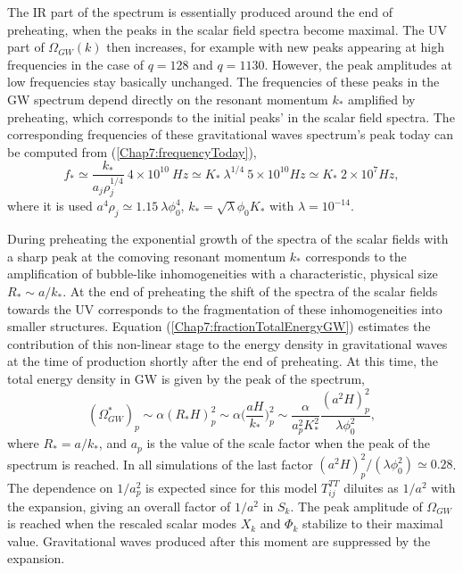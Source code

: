 \documentclass[11pt,a4paper,twoside]{book}
\begin{document}
The IR part of the spectrum is essentially produced around the end of preheating, when the peaks in the scalar field spectra  become maximal. The UV part of $\Omega_{GW}(k)$ then increases, for example with new peaks appearing at high frequencies in the case of $ q=128 $ and $ q=1130 $. However, the peak amplitudes at low frequencies stay basically unchanged. The frequencies of these peaks in the GW spectrum depend directly on the resonant momentum $ k_{*} $ amplified by preheating, which corresponds to the initial peaks' in the scalar field spectra. The corresponding frequencies of these gravitational waves spectrum's peak today can be computed from (\ref{Chap7:frequencyToday}),
\begin{equation}
	\label{Chap7:frequencyTodayResonance}
	f_{*}\simeq \frac{k_{*}}{a_{j}\rho_{j}^{1/4}}\ 4 \times 10^{10}\ Hz \simeq K_{*}\ \lambda^{1/4}\ 5 \times 10^{10} Hz \simeq K_{*}\ 2 \times 10^{7} Hz, 
\end{equation}
where it is used $ a^{4}\rho_{j} \simeq 1.15\ \lambda \phi_{0}^{4} $, $ k_{*}=\sqrt{\lambda}\phi_{0}K_{*} $ with $\lambda = 10^{-14}$. 

During preheating the exponential growth of the spectra of the scalar fields with a sharp peak at the comoving resonant momentum $ k_{*} $ corresponds to the amplification of bubble-like inhomogeneities with a characteristic, physical size $ R_{*} \sim a/k_{*} $. At the end of preheating the shift of the spectra of the scalar fields towards the UV corresponds to the fragmentation of these inhomogeneities into smaller structures. Equation (\ref{Chap7:fractionTotalEnergyGW}) estimates the contribution of this non-linear stage to the energy density in gravitational waves at the time of production shortly after the end of preheating. At this time, the total energy density in GW is given by the peak of the spectrum,
\begin{equation}
\label{Chap7:GWBubblePhase}
(\Omega^{*}_{GW})_{p} \sim \alpha (R_{*} H)^{2}_{p} \sim \alpha \Bigg(\frac{aH}{k_{*}}\Bigg)^{2}_{p} \sim \frac{\alpha}{a^{2}_{p} K_{*}^{2}} \frac{(a^{2}H)_{p}^{2}}{\lambda \phi_{0}^{2}},
\end{equation}
where $ R_{*}=a/k_{*} $, and $ a_{p} $ is the value of the scale factor when the peak of the spectrum is reached. In all simulations of \cite{Chap7:GreenMethod} the last factor $  (a^{2}H)_{p}^{2}/(\lambda \phi_{0}^{2}) \simeq 0.28  $. The dependence on $ 1/a_{p}^{2} $ is expected since for this model $ T^{TT}_{ij} $ diluites as $ 1/a^{2} $ with the expansion, giving an overall factor of $ 1/a^{2} $ in $ S_{k} $. The peak amplitude  of $ \Omega_{GW} $ is reached  when the rescaled scalar modes $ X_{k} $ and $ \Phi_{k} $ stabilize to their maximal value. Gravitational waves produced after this moment are suppressed by the expansion.
\end{document}
